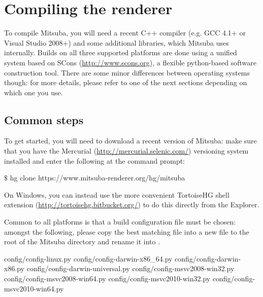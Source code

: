 \section{Compiling the renderer}
To compile Mitsuba, you will need a recent C++ compiler (e.g. GCC 4.1+ or 
Visual Studio 2008+) and some additional libraries, which Mitsuba uses internally. 
Builds on all three supported platforms are done using a unified system
based on SCons (\url{http://www.scons.org}), a flexible python-based 
software construction tool. There are some minor differences between operating systems though: for
more details, please refer to one of the next sections depending on which one you use.

\subsection{Common steps}
To get started, you will need to download a recent version of Mitsuba: make sure that you have the Mercurial (\url{http://mercurial.selenic.com/})
versioning system installed and enter the following at the command prompt:
\begin{shell}
$\texttt{\$}$ hg clone https://www.mitsuba-renderer.org/hg/mitsuba
\end{shell}
On Windows, you can instead use the more convenient TortoiseHG shell extension (\url{http://tortoisehg.bitbucket.org/}) 
to do this directly from the Explorer.

Common to all platforms is that a build configuration file must be chosen: amongst the
following, please copy the best matching file into a new file to the root of the Mitsuba
directory and rename it into .
\begin{shell}
config/config-linux.py  
config/config-darwin-x86_64.py  
config/config-darwin-x86.py  
config/config-darwin-universal.py  
config/config-msvc2008-win32.py  
config/config-msvc2008-win64.py
config/config-msvc2010-win32.py  
config/config-msvc2010-win64.py
\end{shell}

